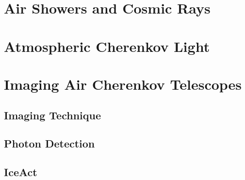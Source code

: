 \section{Air Showers and Cosmic Rays}\label{sec:cosmicrays}

\section{Atmospheric Cherenkov Light}\label{sec:cherenkov}

\section{Imaging Air Cherenkov Telescopes}

\subsection{Imaging Technique}

\subsection{Photon Detection}

\subsection{IceAct}